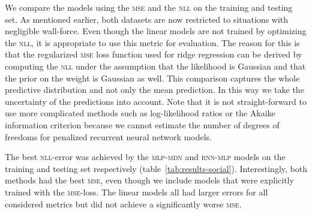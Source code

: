 \documentclass[nobib, a4paper]{tufte-handout}
\begin{document}
We compare the models using the \textsc{mse} and the \textsc{nll} on the training and testing set.
As mentioned earlier, both datasets are now restricted to situations with negligible wall-force.
Even though the linear models are not trained by optimizing the \textsc{nll}, it is appropriate to use this metric for evaluation.
The reason for this is that the regularized \textsc{mse} loss function used for ridge regression can be derived by computing the \textsc{nll} under the assumption that the likelihood is Gaussian and that the prior on the weight is Gaussian as well.
This comparison captures the whole predictive distribution and not only the mean prediction.
In this way we take the uncertainty of the predictions into account.
Note that it is not straight-forward to use more complicated methods such as log-likelihood ratios or the Akaike information criterion because we cannot estimate the number of degrees of freedoms for penalized recurrent neural network models.

The best \textsc{nll}-error was achieved by the \textsc{mlp-mdn} and \textsc{rnn-mlp} models on the training and testing set respectively (table~\ref{tab:results-social}).
Interestingly, both methods had the best \textsc{mse}, even though we include models that were explicitly trained with the \textsc{mse}-loss.
The linear models all had larger errors for all considered metrics but did not achieve a significantly worse \textsc{mse}.
\end{document}
